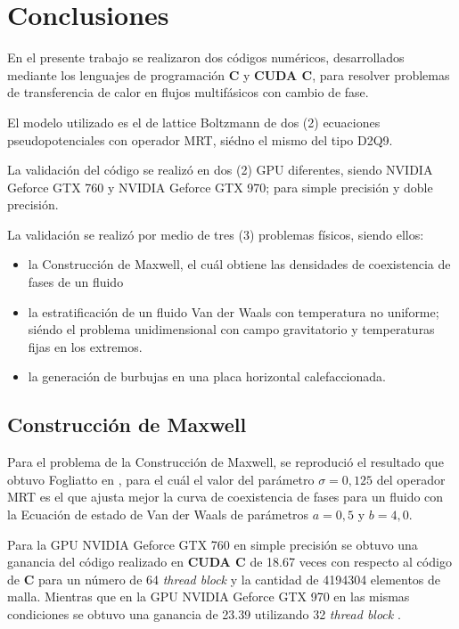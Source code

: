 \chapter{Conclusiones}
\graphicspath{{figs/cap4/}}
\label{cap5}

En el presente trabajo se realizaron dos códigos numéricos, desarrollados mediante los lenguajes de programación \textbf{C} y \textbf{CUDA C}, para resolver problemas de transferencia de calor en flujos multifásicos con cambio de fase.

El modelo utilizado es el de lattice Boltzmann de dos (2) ecuaciones pseudopotenciales con operador MRT, siédno el mismo del tipo D2Q9.

La validación del código se realizó en dos (2) GPU diferentes, siendo NVIDIA Geforce GTX 760 y  NVIDIA Geforce GTX 970; para simple precisión y doble precisión.

La validación se realizó por medio de tres (3) problemas físicos, siendo ellos:

\begin{itemize}
    
    \item la Construcción de Maxwell, el cuál obtiene las densidades de coexistencia de fases de un fluido 

    \item la estratificación de un fluido Van der Waals con temperatura no uniforme; siéndo el problema unidimensional con campo gravitatorio y temperaturas fijas en los extremos.

    \item la generación de burbujas en una placa horizontal calefaccionada.

\end{itemize}

\section{Construcción de Maxwell}

Para el problema de la Construcción de Maxwell, se reprodució el resultado que obtuvo Fogliatto en \cite{fogliatto2019simulation}, para el cuál el valor del parámetro $\sigma = 0,125$ del operador MRT es el que ajusta mejor la curva de coexistencia de fases para un fluido con la Ecuación de estado de Van der Waals de parámetros $ a = 0,5 $ y $ b = 4,0 $. 

Para la GPU NVIDIA Geforce GTX 760 en simple precisión se obtuvo una ganancia del código realizado en \textbf{CUDA C} de 18.67 veces con respecto al código de \textbf{C} para un número de 64 \textit{thread block} y la cantidad de 4194304 elementos de malla. Mientras que en la  GPU NVIDIA Geforce GTX 970 en las mismas condiciones se obtuvo una ganancia de 23.39 utilizando 32 \textit{thread block} .

